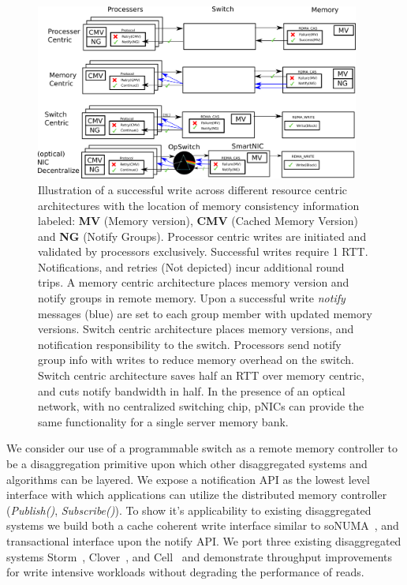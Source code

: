 \begin{figure}
      \centering
      \includegraphics[width=0.95\textwidth]{fig/optical-extension.png}
      \caption{Illustration of a successful write across different
      resource centric architectures with the location of memory
      consistency information labeled: \textbf{MV} (Memory version),
      \textbf{CMV} (Cached Memory Version) and \textbf{NG} (Notify
      Groups). Processor centric writes are
      initiated and validated by processors exclusively. Successful
      writes require 1 RTT. Notifications, and retries (Not depicted)
    incur additional round trips. A memory centric architecture places
    memory version and notify groups in remote memory. Upon a
    successful write \textit{notify} messages (blue) are set to each
    group member with updated memory versions. Switch centric
    architecture places memory versions, and notification
    responsibility to the switch. Processors send notify group info
    with writes to reduce memory overhead on the switch. Switch
    centric architecture saves half an RTT over memory centric, and
    cuts notify bandwidth in half. In the presence of an optical
    network, with no centralized switching chip, pNICs can provide the
    same functionality for a single server memory bank.
      \label{fig:notify}
    }
\end{figure}


We consider our use of a programmable switch as a remote memory
controller to be a disaggregation primitive upon which other
disaggregated systems and algorithms can be layered. We expose a
notification API as the lowest level interface with which applications
can utilize the distributed memory controller (\textit{Publish()},
\textit{Subscribe()}). To show it's applicability to existing
disaggregated systems we build both a cache coherent write interface
similar to soNUMA~\cite{sonuma}, and transactional interface upon the
notify API. We port three existing disaggregated systems
Storm~\cite{storm}, Clover~\cite{clover}, and Cell~\cite{cell} and
demonstrate throughput improvements for write intensive workloads
without degrading the performance of reads.


